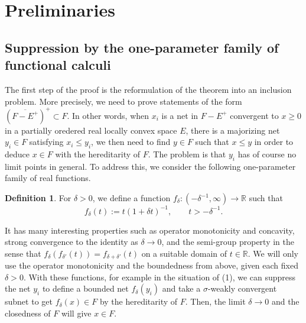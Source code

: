 \documentclass[noamsfonts,a4paper,10pt]{amsart}
\theoremstyle{plain}
\theoremstyle{definition}
\newtheorem{defn}[thm]{Definition}
\theoremstyle{remark}
\begin{document}
\section{Preliminaries}

\subsection{Suppression by the one-parameter family of functional calculi}

The first step of the proof is the reformulation of the theorem into an inclusion problem.
More precisely, we need to prove statements of the form $(\overline{F-E^+})^+\subset F$.
In other words, when $x_i$ is a net in $F-E^+$ convergent to $x\ge0$ in a partially oredered real locally convex space $E$, there is a majorizing net $y_i\in F$ satisfying $x_i\le y_i$, we then need to find $y\in F$ such that $x\le y$ in order to deduce $x\in F$ with the hereditarity of $F$.
The problem is that $y_i$ has of course no limit points in general.
To address this, we consider the following one-parameter family of real functions.
\begin{defn}
For $\delta>0$, we define a function $f_\delta:(-\delta^{-1},\infty)\to\mathbb{R}$ such that
\[f_\delta(t):=t(1+\delta t)^{-1},\qquad t>-\delta^{-1}.\]
\end{defn}
It has many interesting properties such as operator monotonicity and concavity, strong convergence to the identity as $\delta\to0$, and the semi-group property in the sense that $f_\delta(f_{\delta'}(t))=f_{\delta+\delta'}(t)$ on a suitable domain of $t\in\mathbb{R}$.
We will only use the operator monotonicity and the boundedness from above, given each fixed $\delta>0$.
With these functions, for example in the situation of (1), we can suppress the net $y_i$ to define a bounded net $f_\delta(y_i)$ and take a $\sigma$-weakly convergent subnet to get $f_\delta(x)\in F$ by the hereditarity of $F$.
Then, the limit $\delta\to0$ and the closedness of $F$ will give $x\in F$.
\end{document}
